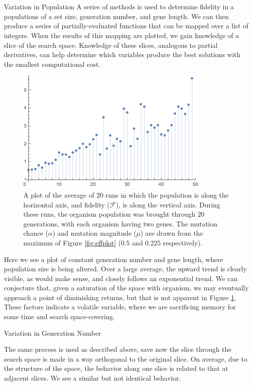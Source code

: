 \documentclass[14pt]{beamer}
\renewcommand{\maketitle}{%
	\begin{center}%
		\Huge\inserttitle\\[5mm]%
		\Large\insertauthor\\[5mm]%
		\Large\insertinstitute%
	\end{center}%
	\vspace*{-1.5ex}%
}
\begin{document}
\begin{frame}{\maketitle}
\begin{columns}
\begin{column}{.45\textwidth}
\begin{block}{Variation in Population}
	A series of methods is used to determine fidelity in a populations of a set size, generation number, and gene length. We can then produce a series of partially-evaluated functions that can be mapped over a list of integers. When the results of this mapping are plotted, we gain knowledge of a slice of the search space. Knowledge of these slices, analogous to partial derivatives, can help determine which variables produce the best solutions with the smallest computational cost. 

	\begin{figure}[htpb]
		\centering
			\includegraphics[scale=1.3]{g1.png}
		\centering
		\caption{A plot of the average of $20$ runs in which the population is along the horizontal axis, and fidelity ($\mathcal{F}$), is along the vertical axis. During these runs, the organism population was brought through $20$ generations, with each organism having two genes. The mutation chance ($\alpha$) and mutation magnitude ($\mu$) are drawn from the maximum of Figure \ref{fig:effplot} ($0.5$ and $0.225$ respectively).}
		\label{fig:pop_plot}
	\end{figure}

	Here we see a plot of constant generation number and gene length, where population size is being altered. Over a large average, the upward trend is clearly visible, as would make sense, and closely follows an exponential trend. We can conjecture that, given a saturation of the space with organism, we may eventually approach a point of diminishing returns, but that is not apparent in Figure \ref{fig:pop_plot}. These factors indicate a volatile variable, where we are sacrificing memory for some time and search space-covering. 
\end{block}
\vspace{1em}
\begin{exampleblock}{Variation in Generation Number}

	The same process is used as described above, save now the slice through the search space is made in a way orthogonal to the original slice. On average, due to the structure of the space, the behavior along one slice is related to that at adjacent slices. We see a similar but not identical behavior. 


\end{exampleblock}
\end{column}
\end{columns}
\end{frame}
\end{document}
